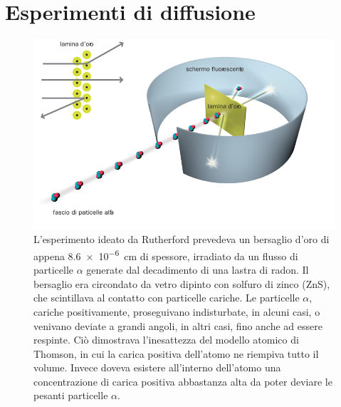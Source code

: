 \documentclass[../main.tex]{subfiles}
\begin{document}
\section{Esperimenti di diffusione}
\begin{figure}[b!]
    \centering
    \includegraphics[width=\textwidth]{rutherford.jpg}
    \caption{L'esperimento ideato da Rutherford prevedeva un bersaglio d'oro di appena \SI{8.6e-6}{\cm} di spessore, irradiato da un flusso di particelle $\alpha$ generate dal decadimento di una lastra di radon. Il bersaglio era circondato da vetro dipinto con solfuro di zinco (ZnS), che scintillava al contatto con particelle cariche. Le particelle $\alpha$, cariche positivamente, proseguivano indisturbate, in alcuni casi, o venivano deviate a grandi angoli, in altri casi, fino anche ad essere respinte. Ciò dimostrava l'inesattezza del modello atomico di Thomson, in cui la carica positiva dell'atomo ne riempiva tutto il volume. Invece doveva esistere all'interno dell'atomo una concentrazione di carica positiva abbastanza alta da poter deviare le pesanti particelle $\alpha$.}
    \label{fig:rutherford}
\end{figure}
\end{document}
